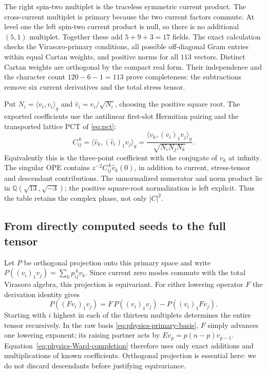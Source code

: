 The right spin-two multiplet is the traceless symmetric current
product. The cross-current multiplet is primary because the two
current factors commute. At level one the left spin-two current
product is null, so there is no additional $(5,1)$ multiplet.
Together these add $5+9+3=17$ fields. The exact calculation checks
the Virasoro-primary conditions, all possible off-diagonal Gram
entries within equal Cartan weights, and positive norms for all
$113$ vectors. Distinct Cartan weights are orthogonal by the compact
real form. Their independence and the character count
$120-6-1=113$ prove completeness: the subtractions remove six current
derivatives and the total stress tensor.

Put $N_i=\langle v_i,v_i\rangle_g$ and
$\widehat v_i=v_i/\sqrt{N_i}$, choosing the positive square root.
The exported coefficients use the antilinear first-slot Hermitian
pairing and the transported lattice PCT of \eqref{eq:pct}:
\begin{equation}\label{eq:physics-primary-three-point}
 C_{ij}^{\ k}
 =\langle\widehat v_k,(\widehat v_i)_1\widehat v_j\rangle_g
 =\frac{\langle v_k,(v_i)_1v_j\rangle_g}
 {\sqrt{N_iN_jN_k}}.
\end{equation}
Equivalently this is the three-point coefficient with the conjugate
of $\widehat v_k$ at infinity. The singular OPE contains
$z^{-2}C_{ij}^{\ k}\widehat v_k(0)$, in addition to current,
stress-tensor and descendant contributions. The unnormalized
numerator and norm product lie in
$\mathbb Q(\sqrt{13},\sqrt{-3})$; the positive square-root
normalization is left explicit. Thus the table retains the complex
phase, not only $|C|^2$.

\subsection{From directly computed seeds to the full tensor}

Let $P$ be orthogonal projection onto this primary space and write
$P((v_i)_1v_j)=\sum_k p_{ij}^{\ k}v_k$. Since current zero modes
commute with the total Virasoro algebra, this projection is equivariant.
For either lowering operator $F$ the derivation identity gives
\begin{equation}\label{eq:physics-Ward-completion}
 P((Fv_i)_1v_j)=F\,P((v_i)_1v_j)-P((v_i)_1Fv_j).
\end{equation}
Starting with $i$ highest in each of the thirteen multiplets determines
the entire tensor recursively. In the raw basis \eqref{eq:physics-primary-basis},
$F$ simply advances one lowering exponent; its raising partner acts
by $E v_p=p(n-p)v_{p-1}$. Equation~\eqref{eq:physics-Ward-completion}
therefore uses only exact additions and multiplications of known
coefficients. Orthogonal projection is essential here: we do not
discard descendants before justifying equivariance.


